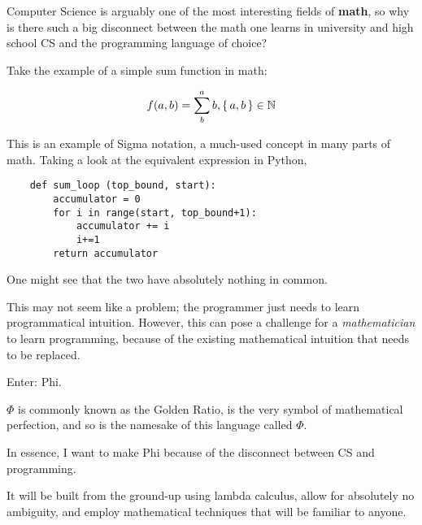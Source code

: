 \documentclass[../main.tex]{subfiles}
\begin{document}
Computer Science is arguably one of the most interesting fields of \textbf{math}, so why is there such a big disconnect between the math one learns in university and high school CS and the programming language of choice?

Take the example of a simple sum function in math:

\[ f(a, b) = \sum^a_{b} b , \set{a,b} \in \mathbb{N}  \]

This is an example of Sigma notation, a much-used concept in many parts of math. Taking a look at the equivalent expression in Python,

\begin{verbatim}
    def sum_loop (top_bound, start):
        accumulator = 0
        for i in range(start, top_bound+1):
            accumulator += i
            i+=1
        return accumulator
\end{verbatim}

One might see that the two have absolutely nothing in common.

This may not seem like a problem; the programmer just needs to learn programmatical intuition. However, this can pose a challenge for a \textit{mathematician} to learn programming, because of the existing mathematical intuition that needs to be replaced.

Enter: Phi.

$\Phi$ is commonly known as the Golden Ratio, is the very symbol of mathematical perfection, and so is the namesake of this language called $\Phi$.

In essence, I want to make Phi because of the disconnect between CS and programming.

It will be built from the ground-up using lambda calculus, allow for absolutely no ambiguity, and employ mathematical techniques that will be familiar to anyone.
\end{document}
